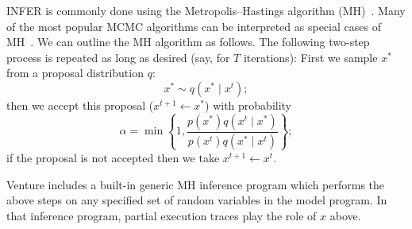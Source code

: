 \documentclass{article} %
\newcommand{\br}[1]{\left\{ #1 \right\}}
\begin{document}
INFER is commonly done using the Metropolis--Hastings algorithm (MH)~\citep{metropolis1953equation}.
Many of the most popular MCMC algorithms can be interpreted as special cases of MH~\citep{andrieu2003introduction}.
We can outline the MH algorithm as follows.
The following two-step process is repeated as long as desired (say, for $T$ iterations):
First we sample $x^*$ from a proposal distribution $q$:
\begin{equation}
 x^* \sim q(x^* \mid x^{t});
\end{equation}
then we accept this proposal ($x^{t+1} \leftarrow x ^*$) with probability
\begin{equation}
  \alpha = \min \br{
    1,
    \frac{p(x^*) q(x^{t}\mid x^*)}{p(x^{t}) q(x^* \mid x^{t})}};
\end{equation}
if the proposal is not accepted then we take $x^{t+1} \gets x^t$.

Venture includes a built-in generic MH inference program which performs the above steps on any specified set of random variables in the model program.
In that inference program, partial execution traces play the role of $x$ above.
\end{document}
